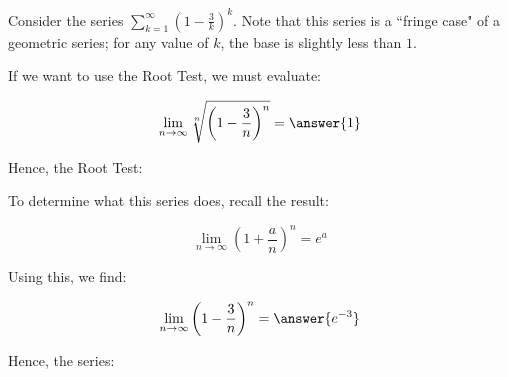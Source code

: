 \documentclass{ximera}
\author{Jim Talamo}
\begin{document}
\begin{exercise}
Consider the series $\sum_{k=1}^{\infty} \left(1-\frac{3}{k}\right)^k$.  Note that this series is a ``fringe case" of a geometric series; for any value of $k$, the base is slightly less than $1$. 

If we want to use the Root Test, we must evaluate:

\[
\lim_{n \to \infty} \sqrt[n]{\left(1-\frac{3}{n}\right)^n} = \answer{1}
\]

Hence, the Root Test:
\begin{multipleChoice}
\end{multipleChoice}

To determine what this series does, recall the result:

\[
\lim_{n \to \infty} \left(1+\frac{a}{n}\right)^n = e^a
\]

Using this, we find:

\[
\lim_{n \to \infty} \left(1-\frac{3}{n}\right)^n = \answer{e^{-3}}
\]

Hence, the series:
\begin{multipleChoice}
\end{multipleChoice}
\end{exercise}
\end{document}
